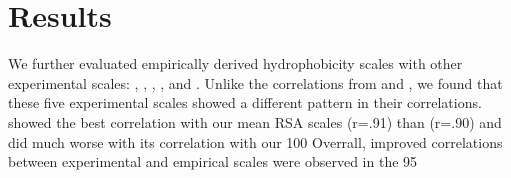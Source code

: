 \documentclass[12pt]{article}
\begin{document}
\section{Results}
We further evaluated empirically derived hydrophobicity scales with other experimental scales: \cite{Fauchere1983}, \cite{Radzicka1988}, \cite{Wimley1996}, \cite{MacCallum2007}, and \cite{Moon2011}. Unlike the correlations from \cite{Wolfenden1981} and \cite{Kyte1981}, we found that these five experimental scales showed a different pattern in their correlations. 
\cite{Fauchere1983} showed the best correlation with our mean RSA scales (r=.91) than \cite{Rose1985} (r=.90) and did much worse with its correlation with our 100%
Overrall, improved correlations between experimental and empirical scales were observed in the 95%
\end{document}
